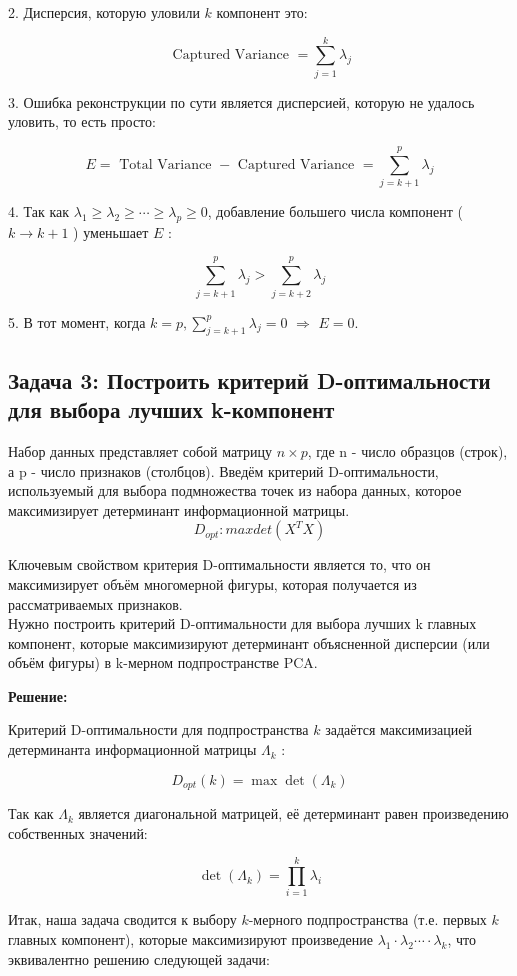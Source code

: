 2. Дисперсия, которую уловили $k$ компонент это:

$$
\text { Captured Variance }=\sum_{j=1}^k \lambda_j
$$

3. Ошибка реконструкции по сути является дисперсией, которую не удалось уловить, то есть просто:

$$
E=\text { Total Variance }- \text { Captured Variance }=\sum_{j=k+1}^p \lambda_j
$$

4. Так как $\lambda_1 \geq \lambda_2 \geq \cdots \geq \lambda_p \geq 0$, добавление большего числа компонент ( $k \rightarrow k+1$ ) уменьшает $E$ :

$$
\sum_{j=k+1}^p \lambda_j>\sum_{j=k+2}^p \lambda_j
$$

5. В тот момент, когда $k=p, \sum_{j=k+1}^p \lambda_j=0$ $\Rightarrow$ $E=0$.

\subsection{Задача 3: Построить критерий D-оптимальности для выбора лучших k-компонент }
Набор данных представляет собой матрицу $n \times p$, где n - число образцов (строк), а p - число признаков (столбцов). Введём критерий D-оптимальности, используемый для выбора подмножества точек из набора данных, которое максимизирует детерминант информационной матрицы.
$$
D_{opt} : max  det(X^{T}X)
$$

Ключевым свойством критерия D-оптимальности является то, что он максимизирует объём многомерной фигуры, которая получается из рассматриваемых признаков. \\
Нужно построить критерий D-оптимальности для выбора лучших 
k главных компонент, которые максимизируют детерминант объясненной дисперсии (или объём фигуры) в k-мерном подпространстве PCA. 

\textbf{Решение:}

Критерий D-оптимальности для подпространства $k$ задаётся максимизацией детерминанта информационной матрицы $\Lambda_k$ :

$$
D_{o p t}(k)=\max \operatorname{det}\left(\Lambda_k\right)
$$

Так как $\Lambda_k$ является диагональной матрицей, её детерминант равен произведению собственных значений:

$$
\operatorname{det}\left(\Lambda_k\right)=\prod_{i=1}^k \lambda_i
$$

Итак, наша задача сводится к выбору $k$-мерного подпространства (т.е. первых $k$ главных компонент), которые максимизируют произведение $\lambda_1 \cdot \lambda_2 \cdots \cdot \lambda_k$, что эквивалентно решению следующей задачи:

